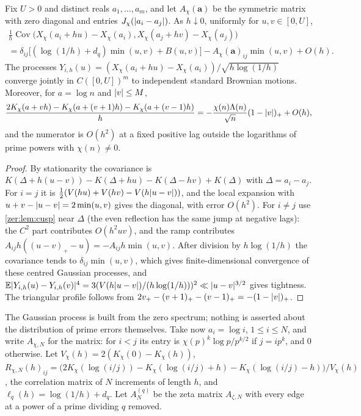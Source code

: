 \begin{theorem}\label{zer:thm:tangent}
Fix $U>0$ and distinct reals $a_1,\dots,a_m$, and let $A_\chi(\boldsymbol a)$ be the symmetric matrix
with zero diagonal and entries $J_\chi(\lvert a_i-a_j\rvert)$. As $h\downarrow0$, uniformly for $u,v\in[0,U]$,
\begin{multline*}
 \frac1h\operatorname{Cov}\bigl(X_\chi(a_i+hu)-X_\chi(a_i),X_\chi(a_j+hv)-X_\chi(a_j)\bigr)\\
 =\delta_{ij}\bigl[(\log(1/h)+d_q)\min(u,v)+B(u,v)\bigr]-A_\chi(\boldsymbol a)_{ij}\min(u,v)+O(h).
\end{multline*}
The processes $Y_{i,h}(u)=(X_\chi(a_i+hu)-X_\chi(a_i))/\sqrt{h\log(1/h)}$ converge jointly in
$C([0,U])^m$ to independent standard Brownian motions. Moreover, for $a=\log n$ and $\lvert v\rvert\le M$,
\[
 \frac{2K_\chi(a+vh)-K_\chi(a+(v+1)h)-K_\chi(a+(v-1)h)}h=-\frac{\chi(n)\Lambda(n)}{\sqrt n}(1-\lvert v\rvert)_++O(h),
\]
and the numerator is $O(h^2)$ at a fixed positive lag outside the logarithms of prime powers
with $\chi(n)\ne0$.
\end{theorem}
\begin{proof}
By stationarity the covariance is
$K(\Delta+h(u-v))-K(\Delta+hu)-K(\Delta-hv)+K(\Delta)$ with $\Delta=a_i-a_j$. For $i=j$ it is
$\tfrac12(V(hu)+V(hv)-V(h\lvert u-v\rvert))$, and the local expansion with $u+v-\lvert u-v\rvert=2\min(u,v)$
gives the diagonal, with error $O(h^2)$. For $i\ne j$ use \cref{zer:lem:cusp} near $\Delta$ (the
even reflection has the same jump at negative lags): the $C^2$ part contributes $O(h^2uv)$, and the
ramp contributes $A_{ij}h((u-v)_+-u)=-A_{ij}h\min(u,v)$. After division by $h\log(1/h)$ the
covariance tends to $\delta_{ij}\min(u,v)$, which gives finite-dimensional convergence of these
centred Gaussian processes, and $\mathbb E\lvert Y_{i,h}(u)-Y_{i,h}(v)\rvert^4=3(V(h\lvert u-v\rvert)/(h\log(1/h)))^2
\ll\lvert u-v\rvert^{3/2}$ gives tightness. The triangular profile follows from
$2v_+-(v+1)_+-(v-1)_+=-(1-\lvert v\rvert)_+$.
\end{proof}

The Gaussian process is built from the zero spectrum; nothing is asserted about the
distribution of prime errors themselves. Take now $a_i=\log i$, $1\le i\le N$, and write
$A_{\chi,N}$ for the matrix: for $i<j$ its entry is $\chi(p)^k\log p/p^{k/2}$ if $j=ip^k$, and $0$
otherwise. Let $V_\chi(h)=2(K_\chi(0)-K_\chi(h))$,
$R_{\chi,N}(h)_{ij}=\bigl(2K_\chi(\log(i/j))-K_\chi(\log(i/j)+h)-K_\chi(\log(i/j)-h)\bigr)/V_\chi(h)$, the
correlation matrix of $N$ increments of length $h$, and $\ell_q(h)=\log(1/h)+d_q$. Let $A_N^{(q)}$ be
the zeta matrix $A_{\zeta,N}$ with every edge at a power of a prime dividing $q$ removed.

